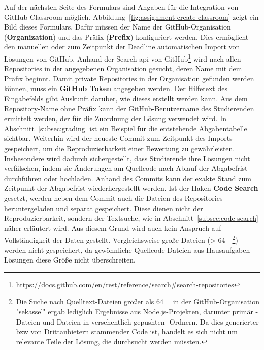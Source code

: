Auf der nächsten Seite des Formulars sind Angaben für die Integration von GitHub Classroom möglich.
Abbildung~\ref{fig:assignment-create-classroom} zeigt ein Bild dieses Formulars.
Dafür müssen der Name der GitHub-Organisation (\textbf{Organization}) und das Präfix (\textbf{Prefix}) konfiguriert werden.
Dies ermöglicht den manuellen oder zum Zeitpunkt der Deadline automatischen Import von Lösungen von GitHub.
Anhand der Search-\ac{api} von GitHub\footnote{
    \url{https://docs.github.com/en/rest/reference/search\#search-repositories}
} wird nach allen Repositories in der angegebenen Organisation gesucht, deren Name mit dem Präfix beginnt.
Damit private Repositories in der Organisation gefunden werden können, muss ein \textbf{GitHub Token} angegeben werden.
Der Hilfetext des Eingabefelds gibt Auskunft darüber, wie dieses erstellt werden kann.
Aus dem Repository-Name ohne Präfix kann der GitHub-Benutzername des Studierenden ermittelt werden, der für die Zuordnung der Lösung verwendet wird.
In Abschnitt~\ref{subsec:grading} ist ein Beispiel für die entstehende Abgabentabelle sichtbar.
Weiterhin wird der neueste Commit zum Zeitpunkt des Imports gespeichert, um die Reproduzierbarkeit einer Bewertung zu gewährleisten.
Insbesondere wird dadurch sichergestellt, dass Studierende ihre Lösungen nicht verfälschen, indem sie Änderungen am Quellcode nach Ablauf der Abgabefrist durchführen oder hochladen.
Anhand des Commits kann der exakte Stand zum Zeitpunkt der Abgabefrist wiederhergestellt werden.
Ist der Haken \textbf{Code Search} gesetzt, werden neben dem Commit auch die Dateien des Repositories heruntergeladen und separat gespeichert.
Diese dienen nicht der Reproduzierbarkeit, sondern der Textsuche, wie in Abschnitt~\ref{subsec:code-search} näher erläutert wird.
Aus diesem Grund wird auch kein Anspruch auf Vollständigkeit der Daten gestellt.
Vergleichsweise große Dateien (> \SI{64}{\kibi\byte}\footnote{
    Die Suche nach Quelltext-Dateien größer als \SI{64}{\kibi\byte} in der GitHub-Organisation "sekassel" ergab lediglich Ergebnisse aus Node.js-Projekten, darunter primär -Dateien und Dateien in versehentlich gepushten -Ordnern.
    Da dies generierter \ac{bzw} von Drittanbietern stammender Code ist, handelt es sich nicht um relevante Teile der Lösung, die durchsucht werden müssten.
}) werden nicht gespeichert, da gewöhnliche Quellcode-Dateien aus Hausaufgaben-Lösungen diese Größe nicht überschreiten.

